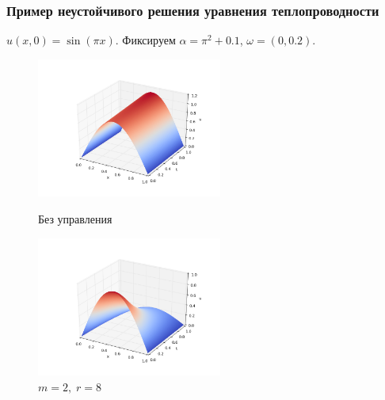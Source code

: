 \documentclass{beamer}
\begin{document}
\begin{frame}
\frametitle{Пример неустойчивого решения уравнения теплопроводности}

$u(x, 0) = \sin{(\pi x)}$. Фиксируем $\alpha = \pi^2 + 0.1$, $\omega = (0, 0.2)$.


\begin{figure}[H]
\centering
\begin{minipage}{.5\textwidth}
  \centering
  \includegraphics[width=2.4in]{par_ex_pi01}
  \caption{Без управления}
  \label{fig:test1}
\end{minipage}%
\begin{minipage}{.5\textwidth}
  \centering
  \includegraphics[width=2.4in]{par_re_pi01}
  \caption{$m = 2,\; r = 8$}
  \label{fig:test2}
\end{minipage}
\end{figure}

\end{frame}
\end{document}
